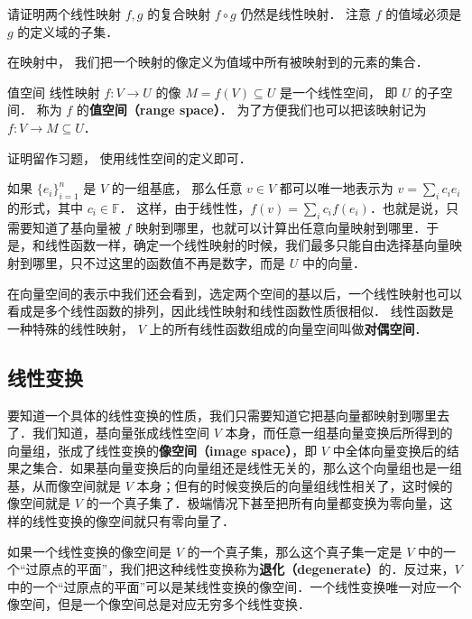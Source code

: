 \begin{exercise}{}
请证明两个线性映射 $f, g$ 的复合映射 $f \circ g$ 仍然是线性映射． 注意 $f$ 的值域必须是 $g$ 的定义域的子集．
\end{exercise}

在映射中， 我们把一个映射的像定义为值域中所有被映射到的元素的集合．
\begin{theorem}{值空间}
线性映射 $f:V\to U$ 的像 $M = f(V) \subseteq U$ 是一个线性空间， 即 $U$ 的子空间． 称为 $f$ 的\textbf{值空间（range space）}． 为了方便我们也可以把该映射记为 $f: V\to M \subseteq U$．
\end{theorem}
证明留作习题， 使用线性空间的定义即可．

如果 $\{{e}_i\}_{i=1}^n$ 是 $V$ 的一组基底， 那么任意 ${v}\in V$ 都可以唯一地表示为 ${v}=\sum_i c_i {e}_i$ 的形式，其中 $c_i\in\mathbb{F}$． 这样，由于线性性，$f({v})=\sum_ic_if({e}_i)$．也就是说，只需要知道了基向量被 $f$ 映射到哪里，也就可以计算出任意向量映射到哪里．于是，和线性函数一样，确定一个线性映射的时候，我们最多只能自由选择基向量映射到哪里，只不过这里的函数值不再是数字，而是 $U$ 中的向量．

在向量空间的表示中我们还会看到，选定两个空间的基以后，一个线性映射也可以看成是多个线性函数的排列，因此线性映射和线性函数性质很相似． 线性函数是一种特殊的线性映射， $V$ 上的所有线性函数组成的向量空间叫做\textbf{对偶空间}．

\subsection{线性变换}

要知道一个具体的线性变换的性质，我们只需要知道它把基向量都映射到哪里去了．我们知道，基向量张成线性空间 $V$ 本身，而任意一组基向量变换后所得到的向量组，张成了线性变换的\textbf{像空间（image space）}，即 $V$ 中全体向量变换后的结果之集合．如果基向量变换后的向量组还是线性无关的，那么这个向量组也是一组基，从而像空间就是 $V$ 本身；但有的时候变换后的向量组线性相关了，这时候的像空间就是 $V$ 的一个真子集了．极端情况下甚至把所有向量都变换为零向量，这样的线性变换的像空间就只有零向量了．

如果一个线性变换的像空间是 $V$ 的一个真子集，那么这个真子集一定是 $V$ 中的一个“过原点的平面”，我们把这种线性变换称为\textbf{退化（degenerate）}的．反过来，$V$ 中的一个“过原点的平面”可以是某线性变换的像空间．一个线性变换唯一对应一个像空间，但是一个像空间总是对应无穷多个线性变换．

